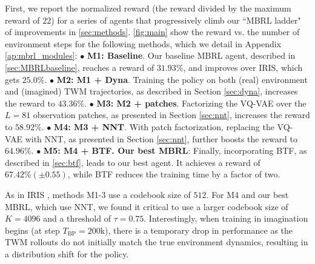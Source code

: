 First, we report the normalized reward (the reward divided by the maximum reward of $22$) for a series of agents that progressively climb our ``MBRL ladder" of improvements in \cref{sec:methods}.
\cref{fig:main} show the reward vs. the number of environment steps for the following methods, which we detail in Appendix \ref{ap:mbrl_modules}:
\smallskip
\newline
$\bullet$ \textbf{M1: Baseline}. Our baseline MBRL agent, described in \cref{sec:MBRLbaseline}, reaches a reward of $31.93\%$, and improves over IRIS, which gets $25.0\%$.
\smallskip
\newline
$\bullet$ \textbf{M2: M1 + Dyna}. Training the policy on both (real) environment and (imagined) TWM trajectories, as described in Section \ref{sec:dyna}, increases the reward to $43.36\%$.
\smallskip
\newline
$\bullet$ \textbf{M3: M2 + patches}. 
Factorizing the VQ-VAE over the $L=81$ observation patches, as presented in Section \ref{sec:nnt}, increases the reward to $58.92\%$.
\smallskip
\newline
$\bullet$ \textbf{M4: M3 + NNT}.
With patch factorization, replacing the VQ-VAE with
NNT, as presented in Section \ref{sec:nnt},
further boosts the reward to $64.96\%$.
\smallskip
\newline
$\bullet$ \textbf{M5: M4 + BTF. Our best MBRL}: Finally, incorporating BTF, as described in  \cref{sec:btf}, leads to our best agent. It achieves a reward of $67.42\% (\pm 0.55)$, while BTF reduces the training time by a factor of two.

As in IRIS \citep{micheli2022transformers}, methods M1-3 use a codebook size of $512$. 
For M4 and our best MBRL, which use NNT, we found it critical to use a larger codebook size of $K=4096$ and a threshold of $\tau=0.75$. 
Interestingly, when training in imagination begins (at step $T_{\text{BP}}=200\text{k}$), there is a temporary drop in performance as the TWM rollouts do not initially match the true environment dynamics, resulting in a distribution shift for the policy. 




